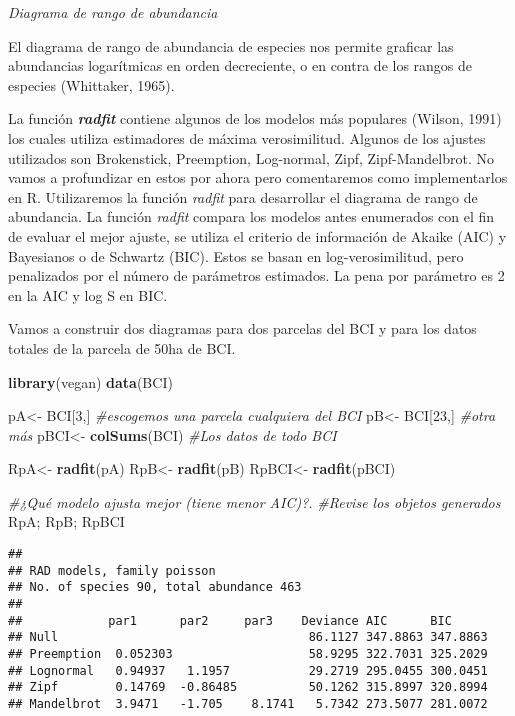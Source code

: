 \documentclass[]{book}
\newenvironment{Shaded}{\begin{snugshade}}{\end{snugshade}}
\newcommand{\KeywordTok}[1]{\textcolor[rgb]{0.13,0.29,0.53}{\textbf{{#1}}}}
\newcommand{\DecValTok}[1]{\textcolor[rgb]{0.00,0.00,0.81}{{#1}}}
\newcommand{\StringTok}[1]{\textcolor[rgb]{0.31,0.60,0.02}{{#1}}}
\newcommand{\CommentTok}[1]{\textcolor[rgb]{0.56,0.35,0.01}{\textit{{#1}}}}
\newcommand{\NormalTok}[1]{{#1}}
\begin{document}
\emph{Diagrama de rango de abundancia}

El diagrama de rango de abundancia de especies nos permite graficar las
abundancias logarítmicas en orden decreciente, o en contra de los rangos
de especies (Whittaker, 1965).

La función \textbf{\emph{radfit}} contiene algunos de los modelos más
populares (Wilson, 1991) los cuales utiliza estimadores de máxima
verosimilitud. Algunos de los ajustes utilizados son Brokenstick,
Preemption, Log-normal, Zipf, Zipf-Mandelbrot. No vamos a profundizar en
estos por ahora pero comentaremos como implementarlos en R. Utilizaremos
la función \emph{radfit} para desarrollar el diagrama de rango de
abundancia. La función \emph{radfit} compara los modelos antes
enumerados con el fin de evaluar el mejor ajuste, se utiliza el criterio
de información de Akaike (AIC) y Bayesianos o de Schwartz (BIC). Estos
se basan en log-verosimilitud, pero penalizados por el número de
parámetros estimados. La pena por parámetro es 2 en la AIC y log S en
BIC.

Vamos a construir dos diagramas para dos parcelas del BCI y para los
datos totales de la parcela de 50ha de BCI.

\begin{Shaded}
\begin{Highlighting}[]
\KeywordTok{library}\NormalTok{(vegan)}
\KeywordTok{data}\NormalTok{(BCI)}

\NormalTok{pA<-}\StringTok{ }\NormalTok{BCI[}\DecValTok{3}\NormalTok{,] }\CommentTok{#escogemos una parcela cualquiera del BCI}
\NormalTok{pB<-}\StringTok{ }\NormalTok{BCI[}\DecValTok{23}\NormalTok{,] }\CommentTok{#otra más}
\NormalTok{pBCI<-}\StringTok{ }\KeywordTok{colSums}\NormalTok{(BCI) }\CommentTok{#Los datos de todo BCI}

\NormalTok{RpA<-}\StringTok{ }\KeywordTok{radfit}\NormalTok{(pA)}
\NormalTok{RpB<-}\StringTok{ }\KeywordTok{radfit}\NormalTok{(pB)}
\NormalTok{RpBCI<-}\StringTok{ }\KeywordTok{radfit}\NormalTok{(pBCI)}

\CommentTok{#¿Qué modelo ajusta mejor (tiene menor AIC)?. }
\CommentTok{#Revise los objetos generados }
\NormalTok{RpA; RpB; RpBCI}
\end{Highlighting}
\end{Shaded}

\begin{verbatim}
## 
## RAD models, family poisson 
## No. of species 90, total abundance 463
## 
##            par1      par2     par3    Deviance AIC      BIC     
## Null                                   86.1127 347.8863 347.8863
## Preemption  0.052303                   58.9295 322.7031 325.2029
## Lognormal   0.94937   1.1957           29.2719 295.0455 300.0451
## Zipf        0.14769  -0.86485          50.1262 315.8997 320.8994
## Mandelbrot  3.9471   -1.705    8.1741   5.7342 273.5077 281.0072
\end{verbatim}
\end{document}

